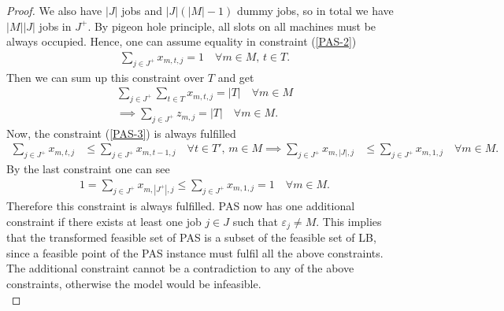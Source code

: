 \documentclass[12pt]{article}
\begin{document}
\begin{proof}
We also have $|J|$ jobs and $|J|(|M|-1)$ dummy jobs, so in total we have $|M||J|$ jobs in $J^+$.
By pigeon hole principle, all slots on all machines must be always occupied.
Hence, one can assume equality in constraint  (\ref{PAS-2})
\begin{gather*}
\sum_{j \in J^+} x_{m, t, j} = 1 \quad \forall m \in M, \, t\in T. 
\end{gather*} 
Then we can sum up this constraint over $T$ and get 
\begin{gather*}
\sum_{j \in J^+}\sum_{t \in T} x_{m, t, j} = |T| \quad \forall m \in M \\
\implies \sum_{j \in J^+}z_{m, j} = |T| \quad \forall m \in M.
\end{gather*}
Now, the constraint (\ref{PAS-3}) is always fulfilled
\begin{align*}
\sum_{j \in J^+} x_{m,t,j} &\leq  \sum_{j \in J^+} x_{m,t-1,j} \quad \forall t \in T', \, m \in M
\implies \sum_{j \in J^+} x_{m,|J|,j}  &\leq  \sum_{j \in J^+} x_{m,1,j} \quad \forall m \in M.
\end{align*}
By the last constraint one can see
\begin{gather*}
1= \sum_{j \in J^+} x_{m,|J^+|,j}  \leq  \sum_{j \in J^+} x_{m,1,j} = 1 \quad \forall m \in M.
\end{gather*}
Therefore this constraint is always fulfilled.
PAS now has one additional constraint  if there exists at least one job $j \in J$  such that $\varepsilon_j \neq M$.
This implies that the transformed feasible set of PAS is a subset of the feasible set of LB, since a feasible point of the PAS instance must fulfil all the above constraints.
The additional constraint cannot be a contradiction to any of the above constraints, otherwise the model would be infeasible.
\\
\end{proof}
\end{document}
